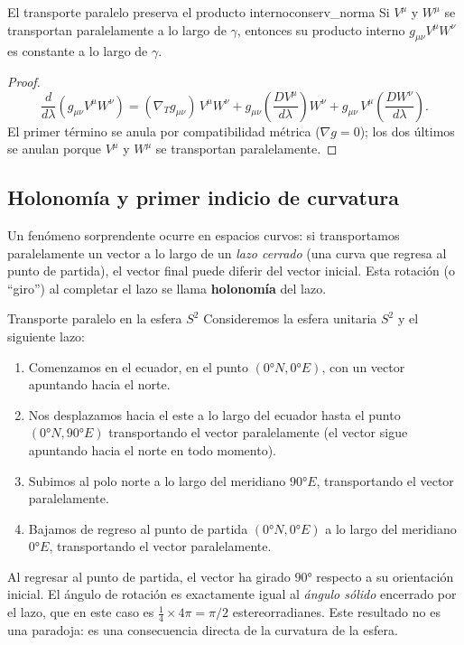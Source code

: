 \begin{proposicion}{El transporte paralelo preserva el producto interno}{conserv_norma}
Si $V^\mu$ y $W^\mu$ se transportan paralelamente a lo largo de $\gamma$, entonces su producto interno $g_{\mu\nu}V^\mu W^\nu$ es constante a lo largo de $\gamma$.
\end{proposicion}
\begin{proof}
\[
  \frac{d}{d\lambda}(g_{\mu\nu}V^\mu W^\nu)
  = (\nabla_T g_{\mu\nu})\, V^\mu W^\nu
  + g_{\mu\nu}\!\left(\frac{DV^\mu}{d\lambda}\right)\!W^\nu
  + g_{\mu\nu}\, V^\mu\!\left(\frac{DW^\nu}{d\lambda}\right).
\]
El primer término se anula por compatibilidad métrica ($\nabla g = 0$); los dos últimos se anulan porque $V^\mu$ y $W^\mu$ se transportan paralelamente.
\end{proof}

\subsection{Holonomía y primer indicio de curvatura}

Un fenómeno sorprendente ocurre en espacios curvos: si transportamos paralelamente un vector a lo largo de un \emph{lazo cerrado} (una curva que regresa al punto de partida), el vector final puede diferir del vector inicial. Esta rotación (o ``giro'') al completar el lazo se llama \textbf{holonomía} del lazo.

\begin{ejemplo}{Transporte paralelo en la esfera $S^2$}{}
Consideremos la esfera unitaria $S^2$ y el siguiente lazo:
\begin{enumerate}[leftmargin=2em, label=(\arabic*)]
  \item Comenzamos en el ecuador, en el punto $(0°N, 0°E)$, con un vector apuntando hacia el norte.
  \item Nos desplazamos hacia el este a lo largo del ecuador hasta el punto $(0°N, 90°E)$ transportando el vector paralelamente (el vector sigue apuntando hacia el norte en todo momento).
  \item Subimos al polo norte a lo largo del meridiano $90°E$, transportando el vector paralelamente.
  \item Bajamos de regreso al punto de partida $(0°N, 0°E)$ a lo largo del meridiano $0°E$, transportando el vector paralelamente.
\end{enumerate}
Al regresar al punto de partida, el vector ha girado $90°$ respecto a su orientación inicial. El ángulo de rotación es exactamente igual al \emph{ángulo sólido} encerrado por el lazo, que en este caso es $\tfrac{1}{4} \times 4\pi = \pi/2$ estereorradianes. Este resultado no es una paradoja: es una consecuencia directa de la curvatura de la esfera.
\end{ejemplo}

